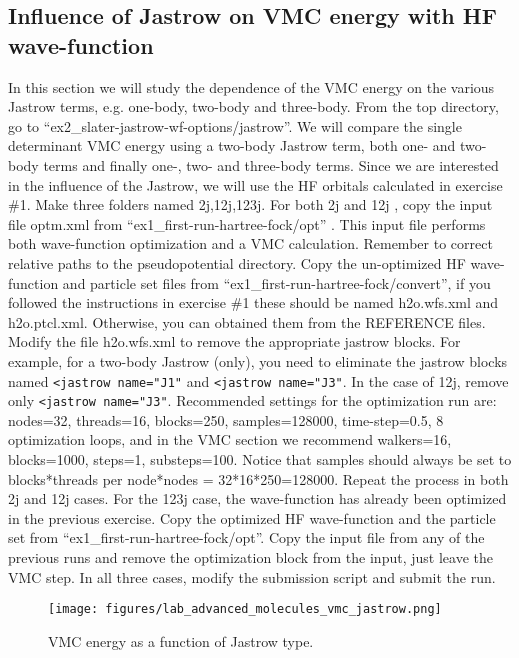 \subsection{Influence of Jastrow on VMC energy with HF wave-function}
In this section we will study the dependence of the VMC energy on the various Jastrow
terms, e.g. one-body, two-body and three-body. From the top directory, go to ``ex2\_slater-jastrow-wf-options/jastrow''. 
We will compare the single determinant VMC energy using a two-body 
Jastrow term, both one- and two-body terms and finally one-, two- and three-body
terms. Since we are interested in the influence of the Jastrow, we will use the HF orbitals
calculated in exercise \#1. Make three folders named 2j,12j,123j. For both 2j and
12j %
, copy the input file optm.xml %
from ``ex1\_first-run-hartree-fock/opt'' . This input file performs both wave-function optimization 
and a VMC calculation. Remember to correct relative paths to the pseudopotential directory. Copy the un-optimized HF wave-function and particle set files
from ``ex1\_first-run-hartree-fock/convert'', if you followed the instructions in exercise \#1 these should be
named h2o.wfs.xml and h2o.ptcl.xml. Otherwise, you can obtained them from the
REFERENCE files. Modify the file h2o.wfs.xml to remove the appropriate jastrow
blocks. For example, for a two-body Jastrow (only), you need to eliminate the jastrow
blocks named \texttt{<jastrow name="J1"} and \texttt{<jastrow name="J3"}. In the case of 12j, remove
only \texttt{<jastrow name="J3"}. Recommended settings for the optimization run are: nodes=32,
threads=16, blocks=250, samples=128000, time-step=0.5, 8 optimization loops, and in the
VMC section we recommend walkers=16, blocks=1000, steps=1, substeps=100. Notice that
samples should always be set to blocks*threads per node*nodes = 32*16*250=128000. Repeat 
the process in both 2j and 12j cases. For the 123j case, the wave-function has
already been optimized in the previous exercise. Copy the optimized HF wave-function and
the particle set from ``ex1\_first-run-hartree-fock/opt''. Copy the input file from any of the previous runs and remove the optimization block from the
input, just leave the VMC step. In all three cases, modify the submission script and submit the run.

\begin{figure}
\begin{center}
\texttt{[image: figures/lab\_advanced\_molecules\_vmc\_jastrow.png]}
\end{center}
\caption{VMC energy as a function of Jastrow type.
\label{fig:lam_vmc_jastrow}
}
\end{figure}

